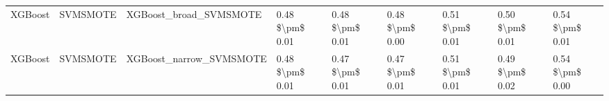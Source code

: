\begin{tabular}{lllllllll}
                        XGBoost &                      SVMSMOTE &                       XGBoost\_broad\_SVMSMOTE & 0.48 \$\textbackslash pm\$ 0.01 &           0.48 \$\textbackslash pm\$ 0.01 &       0.48 \$\textbackslash pm\$ 0.00 &        0.51 \$\textbackslash pm\$ 0.01 &                         0.50 \$\textbackslash pm\$ 0.01 &     0.54 \$\textbackslash pm\$ 0.01 \\
                        XGBoost &                      SVMSMOTE &                      XGBoost\_narrow\_SVMSMOTE & 0.48 \$\textbackslash pm\$ 0.01 &           0.47 \$\textbackslash pm\$ 0.01 &       0.47 \$\textbackslash pm\$ 0.01 &        0.51 \$\textbackslash pm\$ 0.01 &                         0.49 \$\textbackslash pm\$ 0.02 &     0.54 \$\textbackslash pm\$ 0.00 \\
\bottomrule
\end{tabular}
